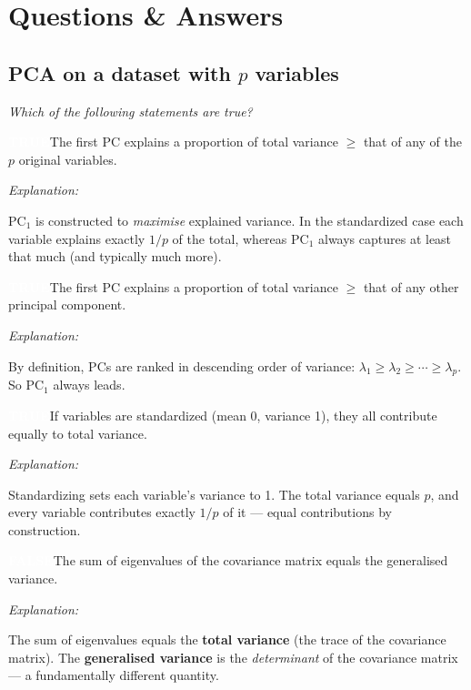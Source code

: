 \documentclass[12pt, a4paper]{article}
\newcommand{\truelabel}{\textcolor{white}{\colorbox{truegreen}{\textbf{TRUE}}}}
\newcommand{\falselabel}{\textcolor{white}{\colorbox{falsered}{\textbf{FALSE}}}}
\newenvironment{statement}[1]{%
  \par\medskip
  \noindent #1\par\smallskip
  \noindent
}{\par}
\newenvironment{explanation}{%
  \noindent\small\color{headergray}\textit{Explanation: }%
}{\par}
\begin{document}
\vspace{1em}

\section{Questions \& Answers}

\subsection{PCA on a dataset with $p$ variables}

\textit{Which of the following statements are true?}

\bigskip

\begin{statement}{\truelabel\quad The first PC explains a proportion of total variance $\geq$ that of any of the $p$ original variables.}
\begin{explanation}
PC$_1$ is constructed to \emph{maximise} explained variance. In the standardized case each variable explains exactly $1/p$ of the total, whereas PC$_1$ always captures at least that much (and typically much more).
\end{explanation}
\end{statement}

\begin{statement}{\truelabel\quad The first PC explains a proportion of total variance $\geq$ that of any other principal component.}
\begin{explanation}
By definition, PCs are ranked in descending order of variance: $\lambda_1 \geq \lambda_2 \geq \cdots \geq \lambda_p$. So PC$_1$ always leads.
\end{explanation}
\end{statement}

\begin{statement}{\truelabel\quad If variables are standardized (mean 0, variance 1), they all contribute equally to total variance.}
\begin{explanation}
Standardizing sets each variable's variance to 1. The total variance equals $p$, and every variable contributes exactly $1/p$ of it --- equal contributions by construction.
\end{explanation}
\end{statement}

\begin{statement}{\falselabel\quad The sum of eigenvalues of the covariance matrix equals the generalised variance.}
\begin{explanation}
The sum of eigenvalues equals the \textbf{total variance} (the trace of the covariance matrix). The \textbf{generalised variance} is the \emph{determinant} of the covariance matrix --- a fundamentally different quantity.
\end{explanation}
\end{statement}
\end{document}
